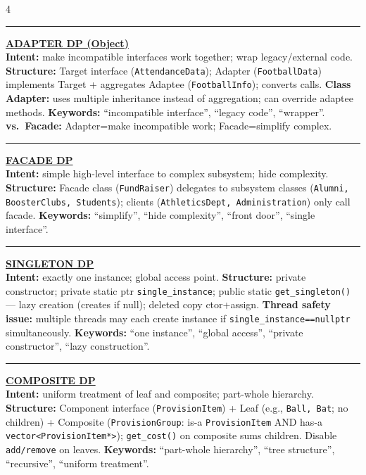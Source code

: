\documentclass[landscape,letterpaper]{article}
\newcommand{\h}[1]{\textbf{#1}}
\newcommand{\hd}[1]{\vspace{1pt}\noindent\textbf{\underline{#1}}\vspace{-1pt}}
\begin{document}
\begin{multicols}{4}
\vspace{-1pt}\noindent\rule{\columnwidth}{0.2pt}\vspace{-3pt}

\hd{ADAPTER DP (Object)}\\[-2pt]
\h{Intent:} make incompatible interfaces work together; wrap legacy/external code. \h{Structure:} Target interface (\texttt{AttendanceData}); Adapter (\texttt{FootballData}) implements Target + aggregates Adaptee (\texttt{FootballInfo}); converts calls. \h{Class Adapter:} uses multiple inheritance instead of aggregation; can override adaptee methods. \h{Keywords:} ``incompatible interface'', ``legacy code'', ``wrapper''. \h{vs.\ Facade:} Adapter=make incompatible work; Facade=simplify complex.\\[-2pt]

\vspace{-1pt}\noindent\rule{\columnwidth}{0.2pt}\vspace{-3pt}

\hd{FACADE DP}\\[-2pt]
\h{Intent:} simple high-level interface to complex subsystem; hide complexity. \h{Structure:} Facade class (\texttt{FundRaiser}) delegates to subsystem classes (\texttt{Alumni, BoosterClubs, Students}); clients (\texttt{AthleticsDept, Administration}) only call facade. \h{Keywords:} ``simplify'', ``hide complexity'', ``front door'', ``single interface''.\\[-2pt]

\vspace{-1pt}\noindent\rule{\columnwidth}{0.2pt}\vspace{-3pt}

\hd{SINGLETON DP}\\[-2pt]
\h{Intent:} exactly one instance; global access point. \h{Structure:} private constructor; private static ptr \texttt{single\_instance}; public static \texttt{get\_singleton()} — lazy creation (creates if null); deleted copy ctor+assign. \h{Thread safety issue:} multiple threads may each create instance if \texttt{single\_instance==nullptr} simultaneously. \h{Keywords:} ``one instance'', ``global access'', ``private constructor'', ``lazy construction''.\\[-2pt]

\vspace{-1pt}\noindent\rule{\columnwidth}{0.2pt}\vspace{-3pt}

\hd{COMPOSITE DP}\\[-2pt]
\h{Intent:} uniform treatment of leaf and composite; part-whole hierarchy. \h{Structure:} Component interface (\texttt{ProvisionItem}) + Leaf (e.g., \texttt{Ball, Bat}; no children) + Composite (\texttt{ProvisionGroup}: is-a \texttt{ProvisionItem} AND has-a \texttt{vector\textless ProvisionItem*\textgreater}); \texttt{get\_cost()} on composite sums children. Disable \texttt{add/remove} on leaves. \h{Keywords:} ``part-whole hierarchy'', ``tree structure'', ``recursive'', ``uniform treatment''.\\[-2pt]


\end{multicols}
\end{document}
